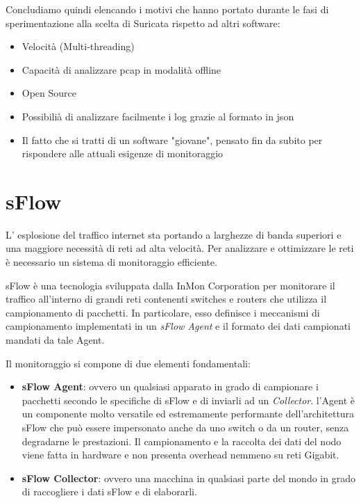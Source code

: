 \documentclass[12pt,a4paper,openright,twoside]{report}
\begin{document}
Concludiamo quindi elencando i motivi che hanno portato durante le fasi di sperimentazione
alla scelta di Suricata rispetto ad altri software:
\begin{itemize}
  \item Velocit\`a (Multi-threading)
  \item Capacit\`a di analizzare pcap in modalit\`a offline
  \item Open Source
  \item Possibili\`a di analizzare facilmente i log grazie al formato in json
  \item Il fatto che si tratti di un software "giovane", pensato fin da
  subito per rispondere alle attuali esigenze di monitoraggio
\end{itemize}

\newpage


\section{sFlow}

L' esplosione del traffico internet sta portando a larghezze di banda superiori
e una maggiore necessit\`a di reti ad alta velocit\`a. Per analizzare e ottimizzare
le reti \`e necessario un sistema di monitoraggio efficiente. \cite{S1}

sFlow \cite{K1} \`e una tecnologia sviluppata dalla InMon Corporation per monitorare il traffico all'interno
di grandi reti contenenti
switches e routers che utilizza il campionamento di pacchetti. In particolare, esso
definisce i meccanismi di campionamento implementati
in un \emph{sFlow Agent} e il formato dei dati campionati mandati da tale Agent.

Il monitoraggio si compone di due elementi fondamentali:
\begin{itemize}
  \item {\bf sFlow Agent}: ovvero un qualsiasi apparato in grado di campionare
  i pacchetti secondo le specifiche di sFlow e di inviarli ad un {\it Collector}.
  l'Agent \`e un componente molto versatile ed estremamente performante dell'architettura
  sFlow che pu\`o essere impersonato anche da uno switch o da un router, senza degradarne
  le prestazioni.
  Il campionamento e la raccolta dei dati del nodo viene fatta in hardware e non presenta
  overhead nemmeno su reti Gigabit.
  \item {\bf sFlow Collector}: ovvero una macchina in qualsiasi parte del mondo in grado di raccogliere
  i dati sFlow e di elaborarli.
\end{itemize}
\end{document}
